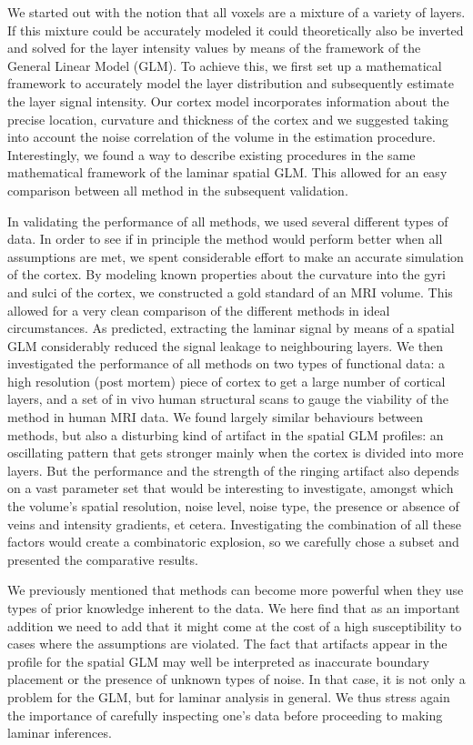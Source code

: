 We started out with the notion that all voxels are a mixture of a variety of layers. If this mixture could be accurately modeled it could theoretically also be inverted and solved for the layer intensity values by means of the framework of the General Linear Model (GLM). To achieve this, we first set up a mathematical framework to accurately model the layer distribution and subsequently estimate the layer signal intensity. Our cortex model incorporates information about the precise location, curvature and thickness of the cortex and we suggested taking into account the noise correlation of the volume in the estimation procedure. Interestingly, we found a way to describe existing procedures in the same mathematical framework of the laminar spatial GLM. This allowed for an easy comparison between all method in the subsequent validation.

In validating the performance of all methods, we used several different types of data. In order to see if in principle the method would perform better when all assumptions are met, we spent considerable effort to make an accurate simulation of the cortex. By modeling known properties about the curvature into the gyri and sulci of the cortex, we constructed a gold standard of an MRI volume. This allowed for a very clean comparison of the different methods in ideal circumstances. As predicted, extracting the laminar signal by means of a spatial GLM considerably reduced the signal leakage to neighbouring layers. We then investigated the performance of all methods on two types of functional data: a high resolution (post mortem) piece of cortex to get a large number of cortical layers, and a set of in vivo human structural scans to gauge the viability of the method in human MRI data. We found largely similar behaviours between methods, but also a disturbing kind of artifact in the spatial GLM profiles: an oscillating pattern that gets stronger mainly when the cortex is divided into more layers. But the performance and the strength of the ringing artifact also depends on a vast parameter set that would be interesting to investigate, amongst which the volume's spatial resolution, noise level, noise type, the presence or absence of veins and intensity gradients, et cetera. Investigating the combination of all these factors would create a combinatoric explosion, so we carefully chose a subset and presented the comparative results. 

We previously mentioned that methods can become more powerful when they use types of prior knowledge inherent to the data. We here find that as an important addition we need to add that it might come at the cost of a high susceptibility to cases where the assumptions are violated. The fact that artifacts appear in the profile for the spatial GLM may well be interpreted as inaccurate boundary placement or the presence of unknown types of noise. In that case, it is not only a problem for the GLM, but for laminar analysis in general. We thus stress again the importance of carefully inspecting one's data before proceeding to making laminar inferences. 

